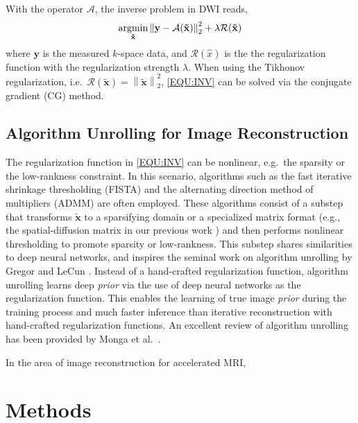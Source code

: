 \documentclass[journal,twoside,web]{ieeecolor}
\newcommand{\argmin}{\operatornamewithlimits{argmin}}
\newcommand{\norm}[1]{\left\lVert#1\right\rVert}
\begin{document}
	With the operator $\mathcal{A}$, the inverse problem in DWI reads,
	\begin{equation}
		\argmin_{\mathbf{\tilde{x}}} \norm{\mathbf{y} - \mathcal{A}(\mathbf{\tilde{x}})}_2^2 + \lambda \mathcal{R}(\mathbf{\tilde{x}})
		\label{EQU:INV}
	\end{equation}
	where $\mathbf{y}$ is the measured $k$-space data,
	and $\mathcal{R}(\hat{x})$ is the the regularization function
	with the regularization strength $\lambda$.
	When using the Tikhonov regularization,
	i.e.~$\mathcal{R}(\mathbf{\tilde{x}}) = \norm{\mathbf{\tilde{x}}}_2^2$,
	\cref{EQU:INV} can be solved via the conjugate gradient (CG) method.


	\subsection{Algorithm Unrolling for Image Reconstruction}

	The regularization function in \cref{EQU:INV} can be nonlinear,
	e.g.~the sparsity \cite{lustig_2007_cs} or the low-rankness \cite{liang_2007_psf} constraint.
	In this scenario, algorithms such as
	the fast iterative shrinkage thresholding (FISTA) \cite{beck_2009_fista}
	and the alternating direction method of multipliers (ADMM) \cite{boyd_2010_admm}
	are often employed.
	These algorithms consist of a substep that transforms $\mathbf{\tilde{x}}$
	to a sparsifying domain or a specialized matrix format
	(e.g., the spatial-diffusion matrix in our previous work \cite{tan_2024_naviepi})
	and then performs nonlinear thresholding to promote sparsity or low-rankness.
	This substep shares similarities to deep neural networks,
	and inspires the seminal work on algorithm unrolling
	by Gregor and LeCun \cite{gregor_2010_algunroll}.
	Instead of a hand-crafted regularization function,
	algorithm unrolling learns deep \textit{prior}
	via the use of deep neural networks as the regularization function.
	This enables the learning of true image \textit{prior} during the training process
	and much faster inference than iterative reconstruction with hand-crafted regularization functions.
	An excellent review of algorithm unrolling
	has been provided by Monga et al.~\cite{monga_2021_algunroll}.

	In the area of image reconstruction for accelerated MRI,


	\section{Methods}
\end{document}
